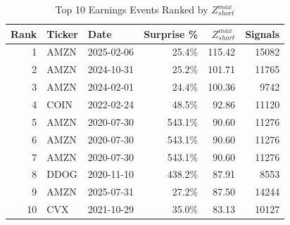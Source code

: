 \begin{table}[htbp]
\centering
\caption{Top 10 Earnings Events Ranked by $Z_{short}^{max}$}
\label{tab:top_events}
\begin{tabular}{rllrrr}
\toprule
Rank & Ticker & Date & Surprise \% & $Z_{short}^{max}$ & Signals \\
\midrule
1 & AMZN & 2025-02-06 & 25.4\% & 115.42 & 15082 \\
2 & AMZN & 2024-10-31 & 25.2\% & 101.71 & 11765 \\
3 & AMZN & 2024-02-01 & 24.4\% & 100.36 & 9742 \\
4 & COIN & 2022-02-24 & 48.5\% & 92.86 & 11120 \\
5 & AMZN & 2020-07-30 & 543.1\% & 90.60 & 11276 \\
6 & AMZN & 2020-07-30 & 543.1\% & 90.60 & 11276 \\
7 & AMZN & 2020-07-30 & 543.1\% & 90.60 & 11276 \\
8 & DDOG & 2020-11-10 & 438.2\% & 87.91 & 8553 \\
9 & AMZN & 2025-07-31 & 27.2\% & 87.50 & 14244 \\
10 & CVX & 2021-10-29 & 35.0\% & 83.13 & 10127 \\
\bottomrule
\end{tabular}
\end{table}
